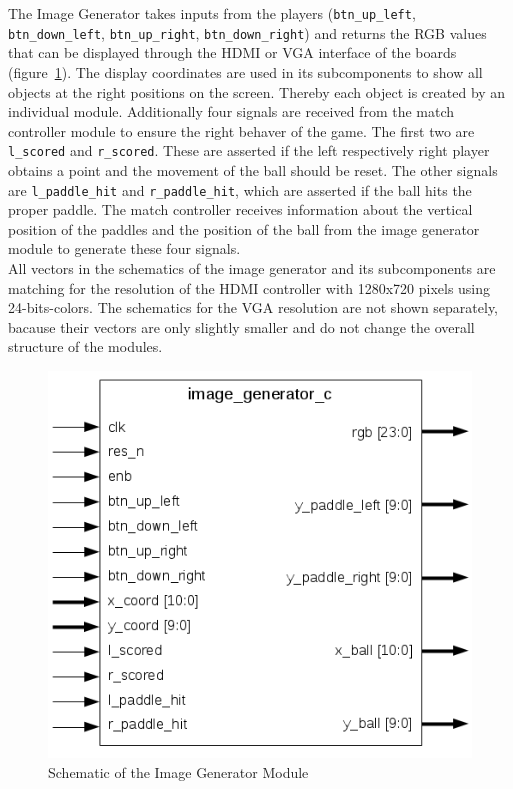         The Image Generator takes inputs from the players (\texttt{btn\_up\_left}, \texttt{btn\_down\_left}, \texttt{btn\_up\_right}, \texttt{btn\_down\_right}) and returns the RGB values that can be displayed through the HDMI or VGA interface of the boards (figure~\ref{img_gen_sch}). The display coordinates are used in its subcomponents to show all objects at the right positions on the screen. Thereby each object is created by an individual module. Additionally four signals are received from the match controller module to ensure the right behaver of the game. The first two are \texttt{l\_scored} and \texttt{r\_scored}. These are asserted if the left respectively right player obtains a point and the movement of the ball should be reset. The other signals are \texttt{l\_paddle\_hit} and \texttt{r\_paddle\_hit}, which are asserted if the ball hits the proper paddle. The match controller receives information about the vertical position of the paddles and the position of the ball from the image generator module to generate these four signals.\\
All vectors in the schematics of the image generator and its subcomponents are matching for the resolution of the HDMI controller with 1280x720 pixels using 24-bits-colors. The schematics for the VGA resolution are not shown separately, bacause their vectors are only slightly smaller and do not change the overall structure of the modules.
	    \begin{figure}[h]
		    \centering
		    \includegraphics[scale=0.7]{images/image_generator_schematic.png}
		    \caption{Schematic of the Image Generator Module}
		    \label{img_gen_sch}
	    \end{figure}
